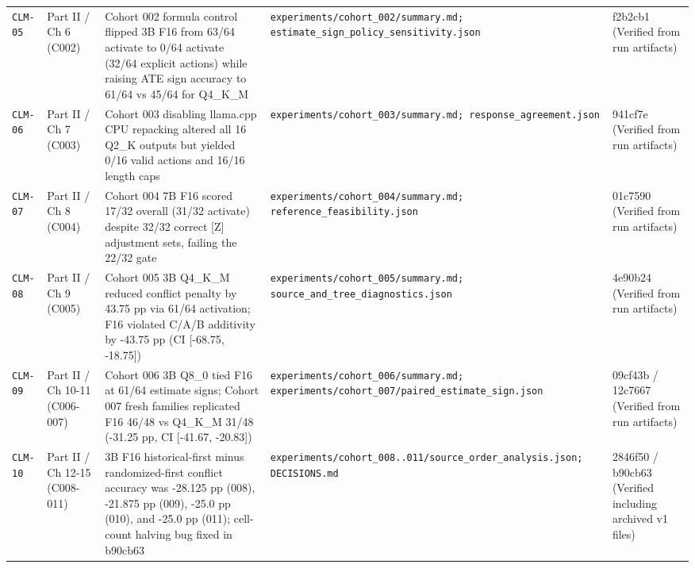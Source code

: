 {\begin{longtable}{@{}>{\raggedright\arraybackslash}p{1.2cm}>{\raggedright\arraybackslash}p{2.0cm}>{\raggedright\arraybackslash}p{4.8cm}>{\raggedright\arraybackslash}p{3.9cm}>{\raggedright\arraybackslash}p{2.5cm}@{}}
\texttt{CLM-\allowbreak{}05} & Part II /\allowbreak{} Ch 6 (C002) & Cohort 002 formula control flipped 3B F16 from 63/\allowbreak{}64 activate to 0/\allowbreak{}64 activate (32/\allowbreak{}64 explicit actions) while raising ATE sign accuracy to 61/\allowbreak{}64 vs 45/\allowbreak{}64 for Q4\_K\_M & \texttt{experiments/\allowbreak{}cohort\_002/\allowbreak{}summary.md; estimate\_sign\_policy\_sensitivity.json} & f2b2cb1 (Verified from run artifacts) \\[2pt]
\texttt{CLM-\allowbreak{}06} & Part II /\allowbreak{} Ch 7 (C003) & Cohort 003 disabling llama.cpp CPU repacking altered all 16 Q2\_K outputs but yielded 0/\allowbreak{}16 valid actions and 16/\allowbreak{}16 length caps & \texttt{experiments/\allowbreak{}cohort\_003/\allowbreak{}summary.md; response\_agreement.json} & 941cf7e (Verified from run artifacts) \\[2pt]
\texttt{CLM-\allowbreak{}07} & Part II /\allowbreak{} Ch 8 (C004) & Cohort 004 7B F16 scored 17/\allowbreak{}32 overall (31/\allowbreak{}32 activate) despite 32/\allowbreak{}32 correct [Z] adjustment sets, failing the 22/\allowbreak{}32 gate & \texttt{experiments/\allowbreak{}cohort\_004/\allowbreak{}summary.md; reference\_feasibility.json} & 01c7590 (Verified from run artifacts) \\[2pt]
\texttt{CLM-\allowbreak{}08} & Part II /\allowbreak{} Ch 9 (C005) & Cohort 005 3B Q4\_K\_M reduced conflict penalty by 43.75 pp via 61/\allowbreak{}64 activation; F16 violated C/\allowbreak{}A/\allowbreak{}B additivity by -\allowbreak{}43.75 pp (CI [-\allowbreak{}68.75, -\allowbreak{}18.75]) & \texttt{experiments/\allowbreak{}cohort\_005/\allowbreak{}summary.md; source\_and\_tree\_diagnostics.json} & 4e90b24 (Verified from run artifacts) \\[2pt]
\texttt{CLM-\allowbreak{}09} & Part II /\allowbreak{} Ch 10-\allowbreak{}11 (C006-\allowbreak{}007) & Cohort 006 3B Q8\_0 tied F16 at 61/\allowbreak{}64 estimate signs; Cohort 007 fresh families replicated F16 46/\allowbreak{}48 vs Q4\_K\_M 31/\allowbreak{}48 (-\allowbreak{}31.25 pp, CI [-\allowbreak{}41.67, -\allowbreak{}20.83]) & \texttt{experiments/\allowbreak{}cohort\_006/\allowbreak{}summary.md; experiments/\allowbreak{}cohort\_007/\allowbreak{}paired\_estimate\_sign.json} & 09cf43b /\allowbreak{} 12c7667 (Verified from run artifacts) \\[2pt]
\texttt{CLM-\allowbreak{}10} & Part II /\allowbreak{} Ch 12-\allowbreak{}15 (C008-\allowbreak{}011) & 3B F16 historical-\allowbreak{}first minus randomized-\allowbreak{}first conflict accuracy was -\allowbreak{}28.125 pp (008), -\allowbreak{}21.875 pp (009), -\allowbreak{}25.0 pp (010), and -\allowbreak{}25.0 pp (011); cell-\allowbreak{}count halving bug fixed in b90cb63 & \texttt{experiments/\allowbreak{}cohort\_008..011/\allowbreak{}source\_order\_analysis.json; DECISIONS.md} & 2846f50 /\allowbreak{} b90cb63 (Verified including archived v1 files) \\[2pt]

\end{longtable}}
